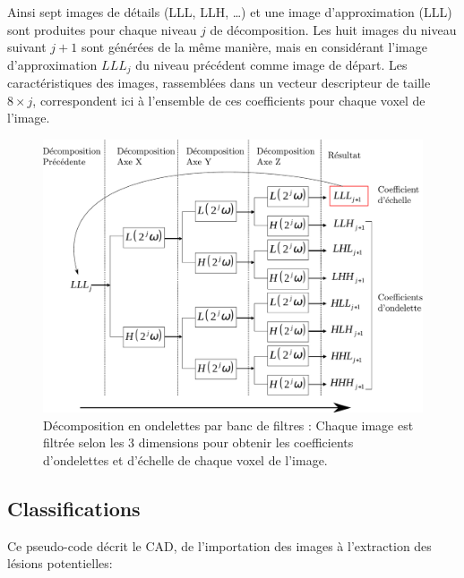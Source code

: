 Ainsi sept images de détails (LLL, LLH, \dots) et une image d’approximation (LLL) sont produites pour chaque niveau $j$ de décomposition. Les huit images du niveau suivant $j+1$ sont générées de la même manière, mais en considérant l’image d’approximation $LLL_j$ du niveau précédent comme image de départ. Les caractéristiques des images, rassemblées dans un vecteur descripteur de taille $8\times j$, correspondent ici à l’ensemble de ces coefficients pour chaque voxel  de l’image. 

\begin{figure}
 \label{fig:ondelettes}
 \includegraphics[width=15cm]{images/decompHotell}
 \caption{Décomposition en ondelettes par banc de filtres : Chaque image est filtrée selon les 3 dimensions pour obtenir les coefficients d'ondelettes et d'échelle de chaque voxel de l'image.}
\end{figure}

\subsection{Classifications}

Ce pseudo-code décrit le CAD, de l'importation des images à l'extraction des lésions potentielles:

